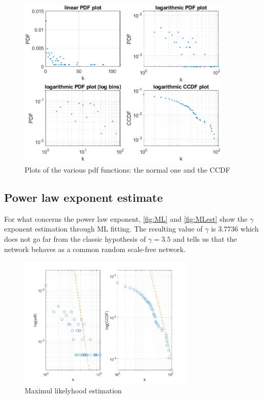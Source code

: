 \documentclass[12pt,a4paper]{article}
\begin{document}
\begin{figure}
\centering
  \includegraphics[width = 0.9\textwidth]{img/pdfPlots}
\caption{Plots of the various pdf functions: the normal one and the CCDF}
\label{fig:pdf}
\end{figure}

\subsection*{Power law exponent estimate}
For what concerns the power law exponent, \autoref{fig:ML} and \autoref{fig:MLest} show the $\gamma$ exponent estimation through ML fitting. The resulting value of $\gamma$ is $3.7736$ which does not go far from the classic hypothesis of $\gamma = 3.5$ and tells us that the network behaves as a common random scale-free network.

\begin{figure}
\centering
  \includegraphics[width = 0.75\textwidth]{img/MLestimate}
\caption{Maximul likelyhood estimation}
\label{fig:MLest}
\end{figure}
\end{document}
